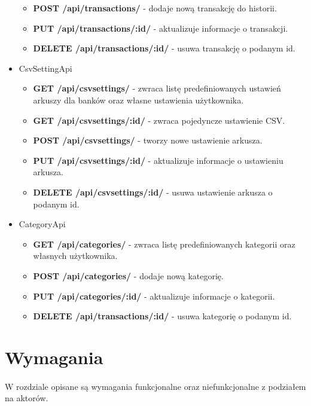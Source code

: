 \documentclass{article}
\begin{document}
\begin{itemize}
\begin{itemize}
				\item \textbf{POST /api/transactions/} - dodaje nową transakcję do historii.
				
				\item \textbf{PUT /api/transactions/:id/} - aktualizuje informacje o transakcji.
				
				\item \textbf{DELETE /api/transactions/:id/} - usuwa transakcję o podanym id.
			\end{itemize}
		\item CsvSettingApi
			\begin{itemize}
				\item \textbf{GET /api/csvsettings/} - zwraca listę predefiniowanych ustawień arkuszy dla banków oraz własne ustawienia użytkownika.
				
				\item \textbf{GET /api/csvsettings/:id/} - zwraca pojedyncze ustawienie CSV.
				
				\item \textbf{POST /api/csvsettings/} - tworzy nowe ustawienie arkusza.
				
				\item \textbf{PUT /api/csvsettings/:id/} - aktualizuje informacje o ustawieniu arkusza.
				
				\item \textbf{DELETE /api/csvsettings/:id/} - usuwa ustawienie arkusza o podanym id.
			\end{itemize}
		\item CategoryApi
			\begin{itemize}
				\item \textbf{GET /api/categories/} - zwraca listę predefiniowanych kategorii oraz własnych użytkownika.
				
				\item \textbf{POST /api/categories/} - dodaje nową kategorię.
				
				\item \textbf{PUT /api/categories/:id/} - aktualizuje informacje o kategorii.
				
				\item \textbf{DELETE /api/transactions/:id/} - usuwa kategorię o podanym id.
			\end{itemize}
	\end{itemize}
	\section{Wymagania}
	\paragraph{} W rozdziale opisane są wymagania funkcjonalne oraz niefunkcjonalne z podziałem na aktorów.
\end{document}
